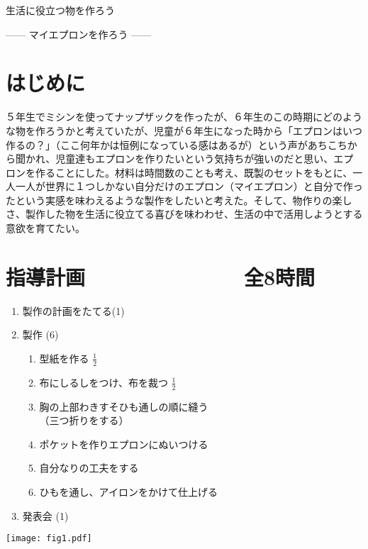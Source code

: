 \documentclass[a4paper,papersize,11pt]{jsarticle}
\begin{document}
\renewcommand{\theenumii}{\arabic{enumii}}
\renewcommand{\labelenumii}{\textcircled{\small{\theenumii}}}
\def\labelitemi{$\circ$}

\begin{center}
{\LARGE
生活に役立つ物を作ろう

------ マイエプロンを作ろう ------}
\end{center}
\vspace{-1.75zh}
\section{はじめに}
５年生でミシンを使ってナップザックを作ったが、６年生のこの時期にどのような物を作ろうかと考えていたが、児童が６年生になった時から「エプロンはいつ作るの？」（ここ何年かは恒例になっている感はあるが）という声があちこちから聞かれ、児童達もエプロンを作りたいという気持ちが強いのだと思い、エプロンを作ることにした。材料は時間数のことも考え、既製のセットをもとに、一人一人が世界に１つしかない自分だけのエプロン（マイエプロン）と自分で作ったという実感を味わえるような製作をしたいと考えた。そして、物作りの楽しさ、製作した物を生活に役立てる喜びを味わわせ、生活の中で活用しようとする意欲を育てたい。\vspace{-0.75zh}

\section{指導計画　　　　　　　　全8時間}
\noindent\hspace{-2zw}
\begin{minipage}{0.65\textwidth}
\begin{enumerate}
\item 製作の計画をたてる\dotfill (1)

\item 製作 \dotfill (6)
\begin{enumerate}
\item 型紙を作る \dotfill $\tfrac{1}{2}$
\item 布にしるしをつけ、布を裁つ \dotfill $\tfrac{1}{2}$
\item 胸の上部\textrightarrow わき\textrightarrow すそ\textrightarrow ひも通しの順に縫う\\
（三つ折りをする）
\item ポケットを作りエプロンにぬいつける 
\item 自分なりの工夫をする 
\item ひもを通し、アイロンをかけて仕上げる 
\end{enumerate}
\item 発表会 \dotfill (1)
\end{enumerate}
\end{minipage}
\hspace{0.75truecm}
\begin{minipage}{0.35\textwidth}
\texttt{[image: fig1.pdf]}
\end{minipage}
\end{document}
